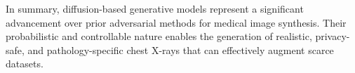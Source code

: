 In summary, diffusion-based generative models represent a significant advancement over prior adversarial methods for medical image synthesis. 
Their probabilistic and controllable nature enables the generation of realistic, privacy-safe, and pathology-specific chest X-rays that can effectively augment scarce datasets. 

